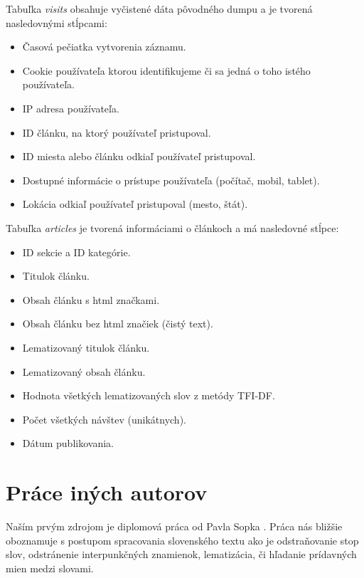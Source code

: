 \documentclass[runningheads,a4paper]{llncs}
\begin{document}
Tabuľka {\em visits} obsahuje vyčistené dáta pôvodného dumpu a je tvorená nasledovnými stĺpcami:
\begin{itemize}
\renewcommand{\labelitemi}{$\bullet$}
  \item Časová pečiatka vytvorenia záznamu.
  \item Cookie používateľa ktorou identifikujeme či sa jedná o toho istého používateľa.
  \item IP adresa používateľa.
  \item ID článku, na ktorý používateľ pristupoval.
  \item ID miesta alebo článku odkiaľ používateľ pristupoval.
  \item Dostupné informácie o prístupe používateľa (počítač, mobil, tablet).
  \item Lokácia odkiaľ používateľ pristupoval (mesto, štát).
\end{itemize}

Tabuľka {\em articles} je tvorená informáciami o článkoch a má nasledovné stĺpce:
\begin{itemize}
\renewcommand{\labelitemi}{$\bullet$}
  \item ID sekcie a ID kategórie.
  \item Titulok článku.
  \item Obsah článku s html značkami.
  \item Obsah článku bez html značiek (čistý text).
  \item Lematizovaný titulok článku.
  \item Lematizovaný obsah článku.
  \item Hodnota všetkých lematizovaných slov z metódy TFI-DF.
  \item Počet všetkých návštev (unikátnych).
  \item Dátum publikovania.
\end{itemize}

\section{Práce iných autorov}
Naším prvým zdrojom je diplomová práca od Pavla Sopka \cite{diplomovka}. 
Práca nás bližšie oboznamuje s postupom spracovania slovenského textu ako je odstraňovanie stop slov, odstránenie interpunkčných znamienok, lematizácia, či hľadanie prídavných mien medzi slovami.
\end{document}
